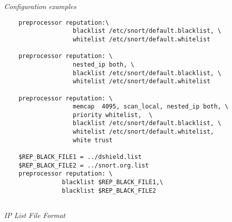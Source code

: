 \documentclass[english]{report}
\begin{document}
\textit{Configuration examples}
\footnotesize
\begin{verbatim}
    preprocessor reputation:\ 
                   blacklist /etc/snort/default.blacklist, \
                   whitelist /etc/snort/default.whitelist
   
    preprocessor reputation: \
                   nested_ip both, \
                   blacklist /etc/snort/default.blacklist, \
                   whitelist /etc/snort/default.whitelist
   
    preprocessor reputation: \
                   memcap  4095, scan_local, nested_ip both, \
                   priority whitelist,  \
                   blacklist /etc/snort/default.blacklist, \
                   whitelist /etc/snort/default.whitelist,
                   white trust
   
    $REP_BLACK_FILE1 = ../dshield.list
    $REP_BLACK_FILE2 = ../snort.org.list
    preprocessor reputation: \
                blacklist $REP_BLACK_FILE1,\
                blacklist $REP_BLACK_FILE2
    
\end{verbatim}
\normalsize
\textit{IP List File Format}
\end{document}
